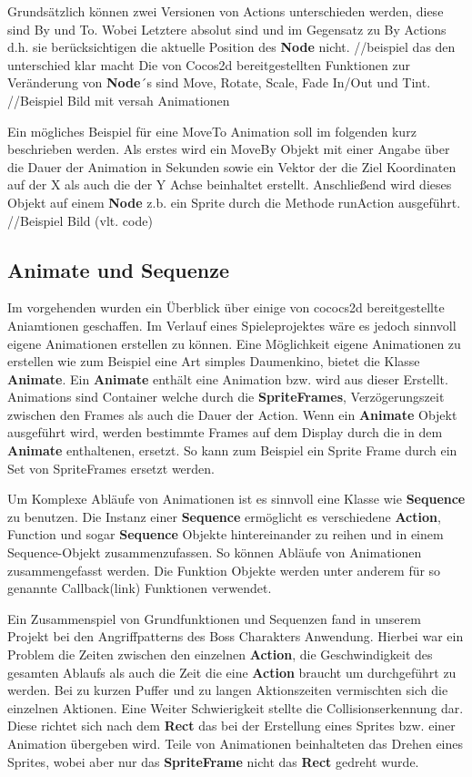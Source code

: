 Grundsätzlich können zwei Versionen von Actions unterschieden werden, diese sind By und To. Wobei Letztere absolut sind und im Gegensatz zu By Actions d.h. sie berücksichtigen  die aktuelle Position des \textbf{Node} nicht. //beispiel das den unterschied klar macht  Die von Cocos2d bereitgestellten Funktionen zur Veränderung von \textbf{Node}´s sind Move, Rotate, Scale, Fade In/Out und Tint. 
//Beispiel Bild mit versah Animationen 

Ein mögliches Beispiel für eine MoveTo Animation soll im folgenden kurz beschrieben werden.
Als erstes wird ein MoveBy Objekt mit einer Angabe über die Dauer der Animation in Sekunden sowie ein Vektor der die Ziel Koordinaten auf der X als auch die der Y Achse beinhaltet erstellt. Anschließend wird dieses Objekt auf einem \textbf{Node} z.b. ein Sprite durch die Methode runAction ausgeführt. 
//Beispiel Bild (vlt. code)


\subsection{Animate und Sequenze}
Im vorgehenden wurden ein Überblick über einige von cococs2d bereitgestellte Aniamtionen geschaffen. Im Verlauf eines Spieleprojektes wäre es jedoch sinnvoll eigene Animationen erstellen zu können. Eine Möglichkeit eigene Animationen zu erstellen wie zum Beispiel eine Art simples Daumenkino, bietet die Klasse \textbf{Animate}. Ein \textbf{Animate} enthält eine Animation bzw. wird aus dieser Erstellt. Animations sind Container welche durch die \textbf{SpriteFrames}, Verzögerungszeit zwischen den Frames als auch die Dauer der Action. Wenn ein \textbf{Animate} Objekt ausgeführt wird, werden bestimmte Frames auf dem Display durch die in dem \textbf{Animate} enthaltenen, ersetzt. So kann zum Beispiel ein Sprite Frame durch ein Set von SpriteFrames ersetzt werden.

Um Komplexe Abläufe von Animationen ist es sinnvoll eine Klasse wie \textbf{Sequence} zu benutzen. Die Instanz einer \textbf{Sequence} ermöglicht es verschiedene \textbf{Action}, Function und sogar \textbf{Sequence} Objekte hintereinander zu reihen und in einem Sequence-Objekt zusammenzufassen. So können Abläufe von Animationen zusammengefasst werden. 
Die Funktion Objekte werden unter anderem für so genannte Callback(link) Funktionen verwendet. 

Ein Zusammenspiel von Grundfunktionen und Sequenzen fand in unserem Projekt bei den Angriffpatterns des Boss Charakters Anwendung. Hierbei war ein Problem die Zeiten zwischen den einzelnen \textbf{Action}, die Geschwindigkeit des gesamten Ablaufs als auch die Zeit die eine \textbf{Action} braucht um durchgeführt zu werden. Bei zu kurzen Puffer und zu langen Aktionszeiten vermischten sich die einzelnen Aktionen. Eine Weiter Schwierigkeit stellte die Collisionserkennung dar. Diese richtet sich nach dem \textbf{Rect} das bei der Erstellung eines Sprites bzw. einer Animation übergeben wird.  Teile von Animationen beinhalteten das Drehen eines Sprites, wobei aber nur das \textbf{SpriteFrame} nicht das \textbf{Rect} gedreht wurde. 



